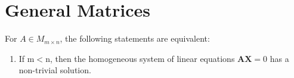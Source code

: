 \documentclass[main.tex]{subfiles}
\begin{document}
\section{General Matrices}
For $A \in M_{m\times n}$, the following statements are equivalent: 
\begin{enumerate}
    \item \label{thm:non_trivial_solution} If $\mathrm{m}<\mathrm{n}$, then the homogeneous system of linear equations $\mathbf{A X}=0$ has a non-trivial solution.
\end{enumerate}
\end{document}
